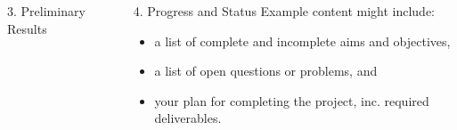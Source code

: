 \documentclass[ %
                author={Important Person},
                supervisor={Academic Guide},
                    degree={MEng},
                     title={Some Structural Guidelines for CS Final Year Posters},
                  subtitle={},
                      type={enterprise},
                      year={2023} ]{poster}
\begin{document}
\begin{frame}{}
\begin{columns}[t]
\begin{column}{0.422\linewidth}
\begin{block}{\Large 3. Preliminary Results}
\begin{itemize}
          \end{itemize}
        \end{block}
      \end{column}
      \begin{column}{0.422\linewidth}
        \begin{block}{\Large 4. Progress and Status}
          Example content might include:
        
          \begin{itemize}
            \item a list of complete and incomplete aims and objectives,
            \item a list of open questions or problems,
                  and
            \item your plan for completing the project, inc. required deliverables.
          \end{itemize}
        \end{block}
      \end{column}
    \end{columns}
    
    \vfill
  
  \end{frame}

\end{document}
